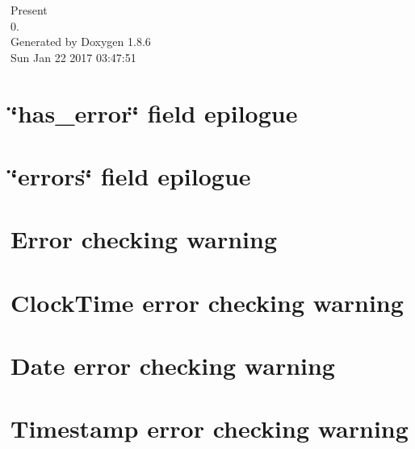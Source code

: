 \documentclass[twoside]{book}
\newcommand{\clearemptydoublepage}{%
  \newpage{\pagestyle{empty}\cleardoublepage}%
}
\begin{document}
\hypersetup{pageanchor=false}
\begin{titlepage}
\vspace*{7cm}
\begin{center}%
{\Large Present \\[1ex]\large 0. }\\
\vspace*{1cm}
{\large Generated by Doxygen 1.8.6}\\
\vspace*{0.5cm}
{\small Sun Jan 22 2017 03:47:51}\\
\end{center}
\end{titlepage}
\clearemptydoublepage
\tableofcontents
\clearemptydoublepage
{}
\hypersetup{pageanchor=true}

\chapter{\char`\"{}has\-\_\-error\char`\"{} field epilogue}
\label{has_error_epilogue}
\hypertarget{has_error_epilogue}{}

\chapter{\char`\"{}errors\char`\"{} field epilogue}
\label{errors_epilogue}
\hypertarget{errors_epilogue}{}

\chapter{Error checking warning}
\label{check_for_error}
\hypertarget{check_for_error}{}

\chapter{Clock\-Time error checking warning}
\label{check_for_error_clocktime}
\hypertarget{check_for_error_clocktime}{}

\chapter{Date error checking warning}
\label{check_for_error_date}
\hypertarget{check_for_error_date}{}

\chapter{Timestamp error checking warning}
\label{check_for_error_timestamp}
\hypertarget{check_for_error_timestamp}{}

\end{document}
